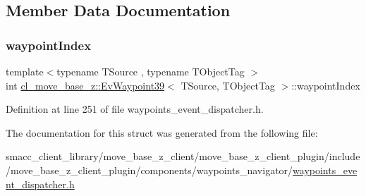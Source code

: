 \subsection{Member Data Documentation}
\mbox{\label{structcl__move__base__z_1_1EvWaypoint39_ad534650b0b970f9441f0824433932657}} 
\subsubsection{\texorpdfstring{waypoint\+Index}{waypointIndex}}
{\footnotesize\ttfamily template$<$typename T\+Source , typename T\+Object\+Tag $>$ \\
int \hyperlink{structcl__move__base__z_1_1EvWaypoint39}{cl\+\_\+move\+\_\+base\+\_\+z\+::\+Ev\+Waypoint39}$<$ T\+Source, T\+Object\+Tag $>$\+::waypoint\+Index}



Definition at line 251 of file waypoints\+\_\+event\+\_\+dispatcher.\+h.



The documentation for this struct was generated from the following file\+:\begin{DoxyCompactItemize}
\item 
smacc\+\_\+client\+\_\+library/move\+\_\+base\+\_\+z\+\_\+client/move\+\_\+base\+\_\+z\+\_\+client\+\_\+plugin/include/move\+\_\+base\+\_\+z\+\_\+client\+\_\+plugin/components/waypoints\+\_\+navigator/\hyperlink{waypoints__event__dispatcher_8h}{waypoints\+\_\+event\+\_\+dispatcher.\+h}\end{DoxyCompactItemize}
